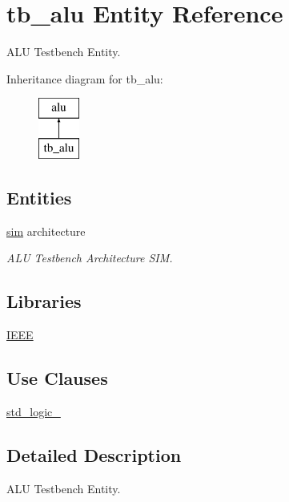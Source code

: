 \hypertarget{classtb__alu}{}\section{tb\+\_\+alu Entity Reference}
\label{classtb__alu}


A\+LU Testbench Entity.  


Inheritance diagram for tb\+\_\+alu\+:\begin{figure}[H]
\begin{center}
\leavevmode
\includegraphics[height=2.000000cm]{classtb__alu}
\end{center}
\end{figure}
\subsection*{Entities}
\begin{DoxyCompactItemize}
\item 
\hyperlink{classtb__alu_1_1sim}{sim} architecture
\begin{DoxyCompactList}\small\item\em A\+LU Testbench Architecture S\+IM. \end{DoxyCompactList}\end{DoxyCompactItemize}
\subsection*{Libraries}
 \begin{DoxyCompactItemize}
\item 
\hyperlink{classtb__alu_ae4f03c286607f3181e16b9aa12d0c6d4}{I\+E\+EE} 
\end{DoxyCompactItemize}
\subsection*{Use Clauses}
 \begin{DoxyCompactItemize}
\item 
\hyperlink{classtb__alu_acd03516902501cd1c7296a98e22c6fcb}{std\+\_\+logic\+\_}   
\end{DoxyCompactItemize}


\subsection{Detailed Description}
A\+LU Testbench Entity. 

